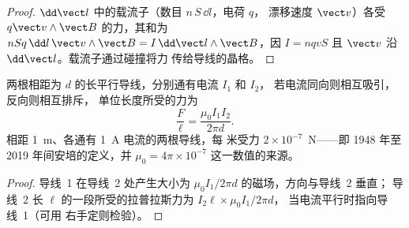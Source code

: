 \begin{proof}
$\dd\vect l$ 中的载流子（数目 $n\,S\,\dd l$，电荷 $q$，
漂移速度 $\vect v$）各受 $q\vect v\wedge\vect B$ 的力，其和为
$nSq\,\dd l\,\vect v\wedge\vect B = I\,\dd\vect l\wedge\vect B$，因 $I = nqvS$
且 $\vect v$ 沿 $\dd\vect l$。载流子通过碰撞将力
传给导线的晶格。
\end{proof}

\begin{proposition}[平行导线间的作用力]\label{prop:b1:magnetostatics:parallel}
两根相距为 $d$ 的长平行导线，分别通有电流 $I_1$ 和 $I_2$，
若电流同向则相互吸引，反向则相互排斥，
单位长度所受的力为
\[
\frac{F}{\ell} = \frac{\mu_0I_1I_2}{2\pi d} .
\]
相距 \qty{1}{m}、各通有 \qty{1}{A} 电流的两根导线，每
米受力 $2 \times 10^{-7}$~N——即 1948 年至 2019 年间安培的定义，并
$\mu_0 = 4\pi \times 10^{-7}$ 这一数值的来源。
\end{proposition}

\begin{proof}
导线~1 在导线~2 处产生大小为 $\mu_0I_1/2\pi d$ 的磁场，方向与导线~2 垂直；
导线~2 长 $\ell$ 的一段所受的拉普拉斯力为 $I_2\ell \times \mu_0I_1/2\pi d$，
当电流平行时指向导线~1（可用
右手定则检验）。
\end{proof}

